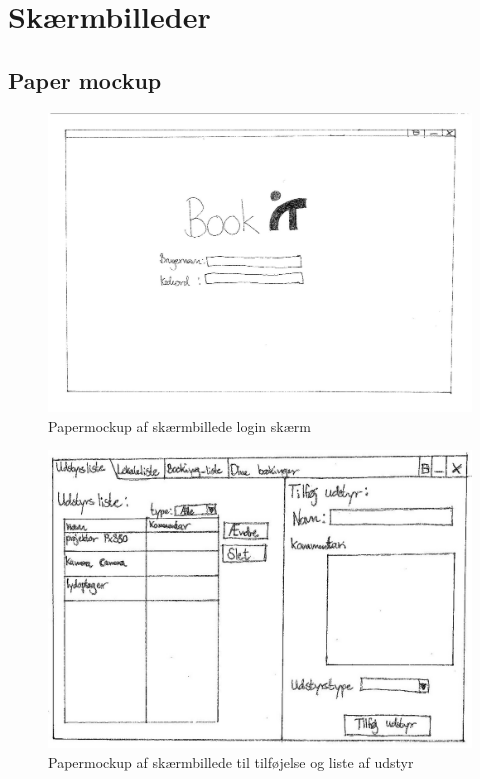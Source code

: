 \chapter{Skærmbilleder}
\label{App_GUI}

\minilof
\clearpage
\section{Paper mockup}
\label{App_GUI_paper}

\begin{figure}[h!]
  \centering
    \includegraphics[angle=90, height=0.75\textheight]{Appendix/GUI-Prototype/PaperMockup/LogIn_001}
  \caption{Papermockup af skærmbillede login skærm}
\label{App_GUI_paper_LogIn}
\end{figure}

\begin{figure}[h!]
  \centering
    \includegraphics[angle=90, height=0.9\textheight]{Appendix/GUI-Prototype/PaperMockup/UdstyrsListe}
  \caption{Papermockup af skærmbillede til tilføjelse og liste af udstyr}
\label{App_GUI_paper_UdstyrsListe}
\end{figure}

